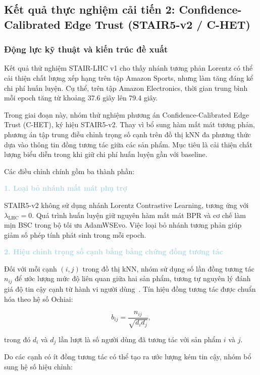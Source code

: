 \subsection{Kết quả thực nghiệm cải tiến 2:
Confidence-Calibrated Edge Trust (STAIR5-v2 / C-HET)}

\subsubsection{Động lực kỹ thuật và kiến trúc đề xuất}

Kết quả thử nghiệm STAIR-LHC v1 cho thấy nhánh tương phản Lorentz
có thể cải thiện chất lượng xếp hạng trên tập Amazon Sports,
nhưng làm tăng đáng kể chi phí huấn luyện.
Cụ thể, trên tập Amazon Electronics, thời gian trung bình
mỗi epoch tăng từ khoảng 37.6 giây lên 79.4 giây.

Trong giai đoạn này, nhóm thử nghiệm phương án
Confidence-Calibrated Edge Trust (C-HET), ký hiệu STAIR5-v2.
Thay vì bổ sung hàm mất mát tương phản,
phương án tập trung điều chỉnh trọng số cạnh
trên đồ thị kNN đa phương thức dựa vào
thông tin đồng tương tác giữa các sản phẩm.
Mục tiêu là cải thiện chất lượng biểu diễn
trong khi giữ chi phí huấn luyện gần với baseline.

Các điều chỉnh chính gồm ba thành phần:

\noindent\textcolor{lightblue}{\textbf{1. Loại bỏ nhánh mất mát phụ trợ}}

STAIR5-v2 không sử dụng nhánh Lorentz Contrastive Learning,
tương ứng với $\lambda_{\mathrm{LHC}}=0$.
Quá trình huấn luyện giữ nguyên hàm mất mát BPR
và cơ chế làm mịn BSC trong bộ tối ưu AdamWSEvo.
Việc loại bỏ nhánh tương phản giúp giảm số phép tính
phát sinh trong mỗi epoch.

\noindent\textcolor{lightblue}{\textbf{2. Hiệu chỉnh trọng số cạnh bằng bằng chứng đồng tương tác}}

Đối với mỗi cạnh $(i,j)$ trong đồ thị kNN,
nhóm sử dụng số lần đồng tương tác $n_{ij}$
để ước lượng mức độ liên quan giữa hai sản phẩm, tương tự nguyên lý đánh giá độ tin cậy cạnh từ hành vi người dùng~\cite{qi2025even}.
Tín hiệu đồng tương tác được chuẩn hóa theo hệ số Ochiai:

\begin{equation}
b_{ij}
=
\frac{n_{ij}}{\sqrt{d_i d_j}},
\end{equation}

trong đó $d_i$ và $d_j$ lần lượt là số người dùng
đã tương tác với sản phẩm $i$ và $j$.

Do các cạnh có ít đồng tương tác
có thể tạo ra ước lượng kém tin cậy,
nhóm bổ sung hệ số hiệu chỉnh:

